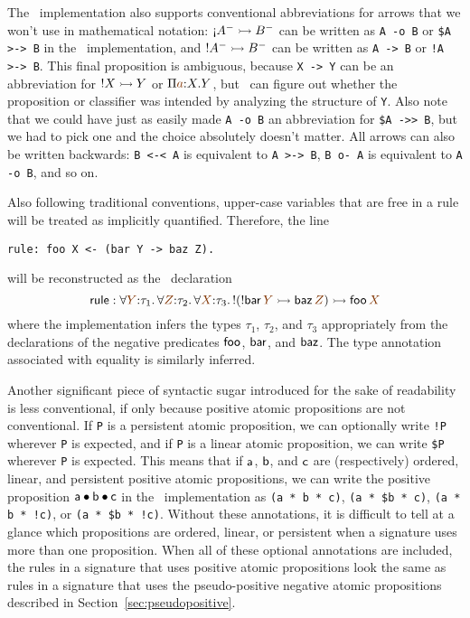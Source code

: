 The \sls~implementation also supports conventional abbreviations for
arrows that we won't use in mathematical notation: ${\gnab}A^- \lefti
B^-$ can be written as \verb|A -o B| or \verb|$A >-> B| in the
\sls~implementation, and ${!}A^- \rightarrowtail B^-$ can be written as
\verb|A -> B| or \verb|!A >-> B|.  This final proposition is
ambiguous, because \verb|X -> Y| can be an abbreviation for ${!}X
\rightarrowtail Y$ or $\Pi \lf{a}{:}X. Y$, but \sls~can figure out whether the
proposition or classifier was intended by analyzing the structure of
\verb|Y|. Also note that we could have just as easily made
\verb|A -o B| an abbreviation for \verb|$A ->> B|, but we had to pick
one and the choice absolutely doesn't matter.  All arrows can also be
written backwards: \verb|B <-< A| is equivalent to \verb|A >-> B|,
\verb|B o- A| is equivalent to \verb|A -o B|, and so on. 

Also
following traditional conventions, upper-case variables that are free
in a rule will be treated as implicitly quantified. Therefore, the
line \bigskip
\begin{verbatim}
rule: foo X <- (bar Y -> baz Z).
\end{verbatim}
\bigskip
will be reconstructed as the \sls~declaration 
\[{\sf rule} : \forall\lf{Y}{:}\tau_1.\,\forall\lf{Z}{:}\tau_2.\,\forall\lf{X}{:}\tau_3.\,{!}({!}{\sf bar}\,\lf{Y} \lefti {\sf baz}\,\lf{Z}) \lefti {\sf foo}\,\lf{X}\] 
%
where the implementation infers the types $\tau_1$, $\tau_2$, and
$\tau_3$ appropriately from the declarations of the negative
predicates ${\sf foo}$, ${\sf bar}$, and ${\sf baz}$. The type annotation
associated with equality is similarly inferred.

Another significant piece of syntactic sugar introduced for 
the sake of readability is less conventional, if only because
positive atomic propositions are not conventional. If \verb|P| is a
persistent atomic proposition, we can optionally write \verb|!P|
wherever \verb|P| is expected, and if \verb|P| is a linear atomic
proposition, we can write \verb|$P| wherever \verb|P| is
expected. This means that if ${\sf a}$, ${\sf b}$, and ${\sf c}$ are
(respectively) ordered, linear, and persistent positive atomic
propositions, we can write the positive proposition ${\sf a} \mathbin{\bullet}
{\sf b} \mathbin{\bullet} {\sf c}$ in the \sls~implementation as
\verb|(a * b * c)|, \verb|(a * $b * c)|, \verb|(a * b * !c)|, or
\verb|(a * $b * !c)|. Without these annotations, it is difficult to
tell at a glance which propositions are ordered, linear, or persistent
when a signature uses more than one proposition. When all of these
optional annotations are included, the rules in a signature that uses
positive atomic propositions look the same as rules in a signature
that uses the pseudo-positive negative atomic propositions described
in Section~\ref{sec:pseudopositive}. 


